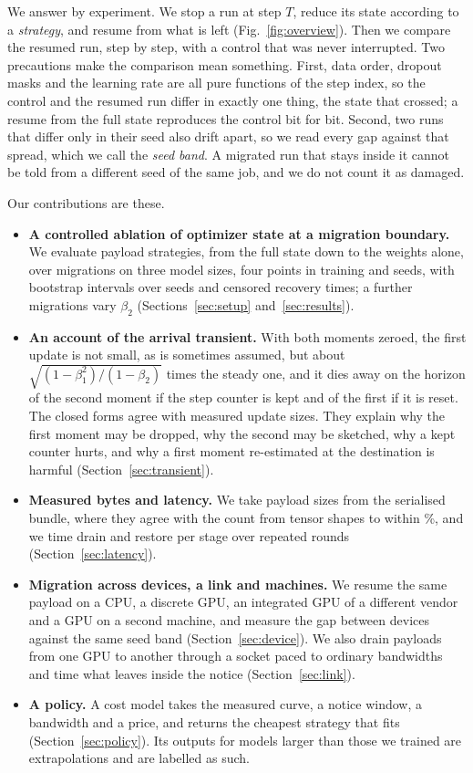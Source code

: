 
We answer by experiment. We stop a run at step $T$, reduce its state according to a \emph{strategy}, and resume from
what is left (Fig.~\ref{fig:overview}). Then we compare the resumed run, step by step, with a control that was never
interrupted. Two precautions make the comparison mean something. First, data order, dropout masks and the learning
rate are all pure functions of the step index, so the control and the resumed run differ in exactly one thing, the
state that crossed; a resume from the full state reproduces the control bit for bit. Second, two runs that differ only
in their seed also drift apart, so we read every gap against that spread, which we call the \emph{seed band}. A
migrated run that stays inside it cannot be told from a different seed of the same job, and we do not count it as
damaged.

Our contributions are these.

\begin{itemize}
\item \textbf{A controlled ablation of optimizer state at a migration boundary.} We evaluate \nArms{} payload
strategies, from the full state down to the weights alone, over \nCells{} migrations on three model sizes, four points
in training and \nSeedsMax{} seeds, with bootstrap intervals over seeds and censored recovery times; a further
\betaCells{} migrations vary $\beta_2$
(Sections~\ref{sec:setup} and~\ref{sec:results}).
\item \textbf{An account of the arrival transient.} With both moments zeroed, the first update is not small, as is
sometimes assumed, but about $\sqrt{(1-\beta_1^2)/(1-\beta_2)}$ times the steady one, and it dies away on the horizon
of the second moment if the step counter is kept and of the first if it is reset. The closed forms agree with measured
update sizes. They explain why the first moment may be dropped, why the second may be sketched, why a kept counter
hurts, and why a first moment re-estimated at the destination is harmful (Section~\ref{sec:transient}).
\item \textbf{Measured bytes and latency.} We take payload sizes from the serialised bundle, where they agree with the
count from tensor shapes to within \bytesWorstPct\%, and we time drain and restore per stage over repeated rounds
(Section~\ref{sec:latency}).
\item \textbf{Migration across devices, a link and machines.} We resume the same payload on a CPU, a discrete GPU, an
integrated GPU of a different vendor and a GPU on a second machine, and measure the gap between devices against the
same seed band (Section~\ref{sec:device}). We also drain payloads from one GPU to another through a socket paced to
ordinary bandwidths and time what leaves inside the notice (Section~\ref{sec:link}).
\item \textbf{A policy.} A cost model takes the measured curve, a notice window, a bandwidth and a price, and returns
the cheapest strategy that fits (Section~\ref{sec:policy}). Its outputs for models larger than those we trained are
extrapolations and are labelled as such.
\end{itemize}

